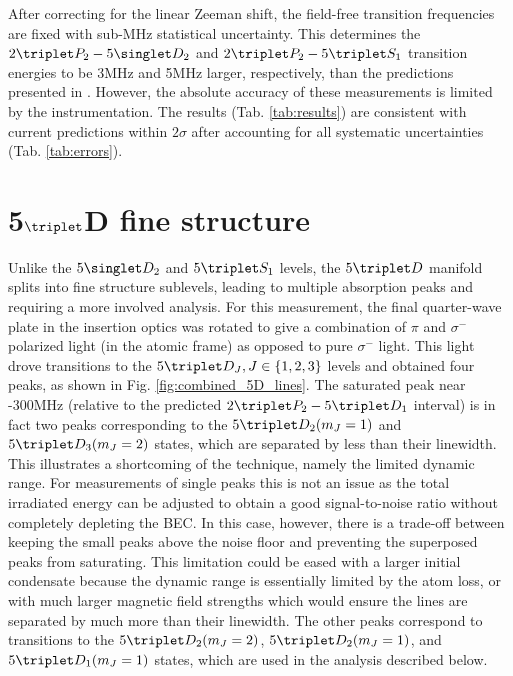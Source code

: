 	After correcting for the linear Zeeman shift, the field-free transition frequencies are fixed with sub-MHz statistical uncertainty.
	This determines the $2\triplet P_2-5\singlet D_2$ and $2\triplet P_2-5\triplet S_1$ transition energies to be 3MHz and 5MHz larger, respectively, than the predictions presented in \cite{Drake07}.
	However, the absolute accuracy of these measurements is limited by the instrumentation.
	The results (Tab.	\ref{tab:results}) are consistent with current predictions \cite{Drake07} within $2\sigma$ after accounting for all systematic uncertainties (Tab.	\ref{tab:errors}).

\section{5$\triplet$D fine structure}

	Unlike the $5\singlet D_2$ and $5\triplet S_1$ levels, the $5\triplet D$ manifold splits into fine structure sublevels, leading to multiple absorption peaks and requiring a more involved analysis.
	For this measurement, the final quarter-wave plate in the insertion optics was rotated to give a combination of $\pi$ and $\sigma^-$ polarized light (in the atomic frame) as opposed to pure $\sigma^-$ light.
	This light drove transitions to the $5\triplet D_J, J\in\{1,2,3\}$ levels and obtained four peaks, as shown in Fig.	\ref{fig:combined_5D_lines}.
	The saturated peak near -300MHz (relative to the predicted $2\triplet P_2 - 5\triplet D_1$ interval) is in fact two peaks corresponding to the $5\triplet D_2(m_J=1)$ and $5\triplet D_3(m_J=2)$ states, which are separated by less than their linewidth. 
	This illustrates a shortcoming of the technique, namely the limited dynamic range.
	For measurements of single peaks this is not an issue as the total irradiated energy can be adjusted to obtain a good signal-to-noise ratio without completely depleting the BEC.
	In this case, however, there is a trade-off between keeping the small peaks above the noise floor and preventing the superposed peaks from saturating.
	This limitation could be eased with a larger initial condensate because the dynamic range is essentially limited by the atom loss, or with much larger magnetic field strengths which would ensure the lines are separated by much more than their linewidth.
	The other peaks correspond to transitions to the $5\triplet D_2(m_J=2)$, $5\triplet D_2(m_J=1)$, and $5\triplet D_1(m_J=1)$ states, which are used in the analysis described below.

